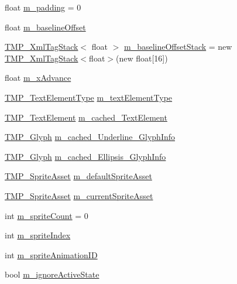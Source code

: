 \begin{DoxyCompactItemize}
\item 
float \mbox{\hyperlink{class_t_m_pro_1_1_t_m_p___text_a46e80ae80fb2e5331104cf9acc489185}{m\+\_\+padding}} = 0
\item 
float \mbox{\hyperlink{class_t_m_pro_1_1_t_m_p___text_a7dae8b748e73eb31da6ad69fd0577161}{m\+\_\+baseline\+Offset}}
\item 
\mbox{\hyperlink{struct_t_m_pro_1_1_t_m_p___xml_tag_stack}{T\+M\+P\+\_\+\+Xml\+Tag\+Stack}}$<$ float $>$ \mbox{\hyperlink{class_t_m_pro_1_1_t_m_p___text_adec2e90e02f326c0cd16bc09f450343d}{m\+\_\+baseline\+Offset\+Stack}} = new \mbox{\hyperlink{struct_t_m_pro_1_1_t_m_p___xml_tag_stack}{T\+M\+P\+\_\+\+Xml\+Tag\+Stack}}$<$float$>$(new float\mbox{[}16\mbox{]})
\item 
float \mbox{\hyperlink{class_t_m_pro_1_1_t_m_p___text_ad65f5452d26d0f6ad64fdf52ee393103}{m\+\_\+x\+Advance}}
\item 
\mbox{\hyperlink{namespace_t_m_pro_ab5662f47179bf1b81c575ecf80b24065}{T\+M\+P\+\_\+\+Text\+Element\+Type}} \mbox{\hyperlink{class_t_m_pro_1_1_t_m_p___text_a0db7b5499781e603016e27d8a433f28d}{m\+\_\+text\+Element\+Type}}
\item 
\mbox{\hyperlink{class_t_m_pro_1_1_t_m_p___text_element}{T\+M\+P\+\_\+\+Text\+Element}} \mbox{\hyperlink{class_t_m_pro_1_1_t_m_p___text_accfbe93901f6a1d73d8cc2591c362949}{m\+\_\+cached\+\_\+\+Text\+Element}}
\item 
\mbox{\hyperlink{class_t_m_pro_1_1_t_m_p___glyph}{T\+M\+P\+\_\+\+Glyph}} \mbox{\hyperlink{class_t_m_pro_1_1_t_m_p___text_a5b1e69b5f0c1091173eaa321f8ee35e1}{m\+\_\+cached\+\_\+\+Underline\+\_\+\+Glyph\+Info}}
\item 
\mbox{\hyperlink{class_t_m_pro_1_1_t_m_p___glyph}{T\+M\+P\+\_\+\+Glyph}} \mbox{\hyperlink{class_t_m_pro_1_1_t_m_p___text_a8dd4da482f8f99af1a9828383e8485a7}{m\+\_\+cached\+\_\+\+Ellipsis\+\_\+\+Glyph\+Info}}
\item 
\mbox{\hyperlink{class_t_m_pro_1_1_t_m_p___sprite_asset}{T\+M\+P\+\_\+\+Sprite\+Asset}} \mbox{\hyperlink{class_t_m_pro_1_1_t_m_p___text_aafef7e5751773a429ac2f22cdf826c2a}{m\+\_\+default\+Sprite\+Asset}}
\item 
\mbox{\hyperlink{class_t_m_pro_1_1_t_m_p___sprite_asset}{T\+M\+P\+\_\+\+Sprite\+Asset}} \mbox{\hyperlink{class_t_m_pro_1_1_t_m_p___text_ae30f0757b5a41b8ce4ffb264498c21e3}{m\+\_\+current\+Sprite\+Asset}}
\item 
int \mbox{\hyperlink{class_t_m_pro_1_1_t_m_p___text_a9e5fd7af26e3596889f109b852f52d56}{m\+\_\+sprite\+Count}} = 0
\item 
int \mbox{\hyperlink{class_t_m_pro_1_1_t_m_p___text_ad4cabeff1840482d85bf4fbea52d5bbe}{m\+\_\+sprite\+Index}}
\item 
int \mbox{\hyperlink{class_t_m_pro_1_1_t_m_p___text_a7dad53daeaf6890b5628048d7c1df5cb}{m\+\_\+sprite\+Animation\+ID}}
\item 
bool \mbox{\hyperlink{class_t_m_pro_1_1_t_m_p___text_aa18a63113d231a3307f44324bb14145a}{m\+\_\+ignore\+Active\+State}}
\end{DoxyCompactItemize}
